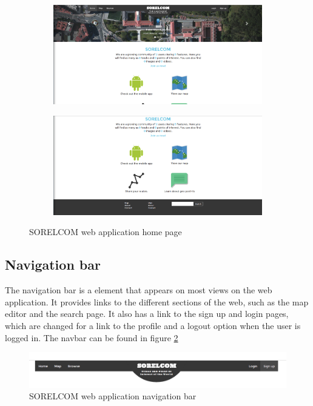 \begin{figure}[ht]
  \centering
  \begin{subfigure}{.45\textwidth}
    \centering
    \includegraphics[width=.9\textwidth]{fig/homepage}
  \end{subfigure}
  \begin{subfigure}{.45\textwidth}
    \centering
    \includegraphics[width=.9\textwidth]{fig/homepage-bottom}
  \end{subfigure}  
  \caption{SORELCOM web application home page}
  \label{fig:homepage}
\end{figure} 

\subsection{Navigation bar}

The navigation bar is a element that appears on most views on the web application. It provides links to the different sections of the web, such as the map editor and the search page. It also has a link to the sign up and login pages, which are changed for a link to the profile and a logout option when the user is logged in. The navbar can be found in figure \ref{fig:navbar}

\begin{figure}[ht]
  \centering
  \includegraphics[width=.9\textwidth]{fig/navbar}
  \caption{SORELCOM web application navigation bar}
  \label{fig:navbar}
\end{figure}

